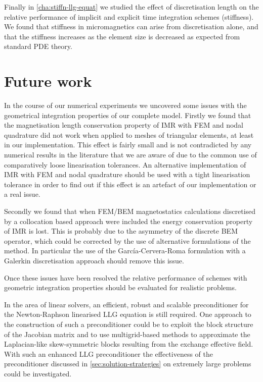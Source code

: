 Finally in \cref{cha:stiffn-llg-equat} we studied the effect of discretisation length on the relative performance of implicit and explicit time integration schemes (stiffness).
We found that stiffness in micromagnetics can arise from discretisation alone, and that the stiffness increases as the element size is decreased as expected from standard PDE theory.



\section{Future work}


In the course of our numerical experiments we uncovered some issues with the geometrical integration properties of our complete model.
Firstly we found that the magnetisation length conservation property of IMR with FEM and nodal quadrature did not work when applied to meshes of triangular elements, at least in our implementation.
This effect is fairly small and is not contradicted by any numerical results in the literature that we are aware of due to the common use of comparatively loose linearisation tolerances.
An alternative implementation of IMR with FEM and nodal quadrature should be used with a tight linearisation tolerance in order to find out if this effect is an artefact of our implementation or a real issue.

Secondly we found that when FEM/BEM magnetostatics calculations discretised by a collocation based approach were included the energy conservation property of IMR is lost.
This is probably due to the asymmetry of the discrete BEM operator, which could be corrected by the use of alternative formulations of the method.
In particular the use of the Garc\'{i}a-Cervera-Roma formulation \cite{Garcia-Cervera2006} with a Galerkin discretisation approach \cite[75]{Wrobel2002} should remove this issue.

Once these issues have been resolved the relative performance of schemes with geometric integration properties should be evaluated for realistic problems.

In the area of linear solvers, an efficient, robust and scalable preconditioner for the Newton-Raphson linearised LLG equation is still required.
One approach to the construction of such a preconditioner could be to exploit the block structure of the Jacobian matrix and to use multigrid-based methods to approximate the Laplacian-like skew-symmetric blocks resulting from the exchange effective field.
With such an enhanced LLG preconditioner the effectiveness of the preconditioner discussed in \cref{sec:solution-strategies} on extremely large problems could be investigated.



